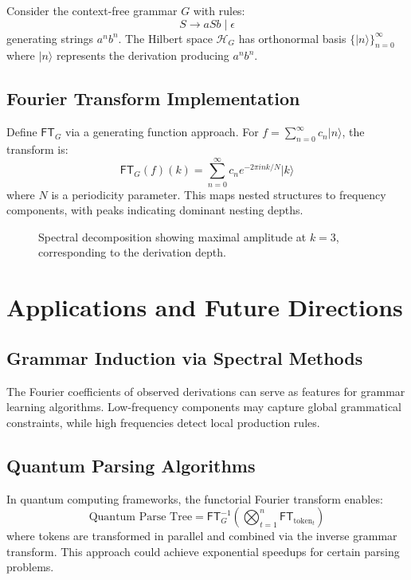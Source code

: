 \documentclass[11pt]{article}
\begin{document}
Consider the context-free grammar \( G \) with rules:
\[
S \rightarrow a S b \mid \epsilon
\]
generating strings \( a^n b^n \). The Hilbert space \( \mathcal{H}_G \) has orthonormal basis \( \{ |n\rangle \}_{n=0}^\infty \) where \( |n\rangle \) represents the derivation producing \( a^n b^n \).

\subsection{Fourier Transform Implementation}
Define \( \mathsf{FT}_G \) via a generating function approach. For \( f = \sum_{n=0}^\infty c_n |n\rangle \), the transform is:
\[
\mathsf{FT}_G(f)(k) = \sum_{n=0}^\infty c_n e^{-2\pi i n k / N} |k\rangle
\]
where \( N \) is a periodicity parameter. This maps nested structures to frequency components, with peaks indicating dominant nesting depths.

\begin{figure}[ht]
\centering
{}
\caption{Spectral decomposition showing maximal amplitude at \( k=3 \), corresponding to the derivation depth.}
\end{figure}

\section{Applications and Future Directions}
\label{sec:applications}

\subsection{Grammar Induction via Spectral Methods}
The Fourier coefficients of observed derivations can serve as features for grammar learning algorithms. Low-frequency components may capture global grammatical constraints, while high frequencies detect local production rules.

\subsection{Quantum Parsing Algorithms}
In quantum computing frameworks, the functorial Fourier transform enables:
\[
\text{Quantum Parse Tree} = \mathsf{FT}_G^{-1} \left( \bigotimes_{t=1}^n \mathsf{FT}_{\text{token}_t} \right)
\]
where tokens are transformed in parallel and combined via the inverse grammar transform. This approach could achieve exponential speedups for certain parsing problems.
\end{document}
